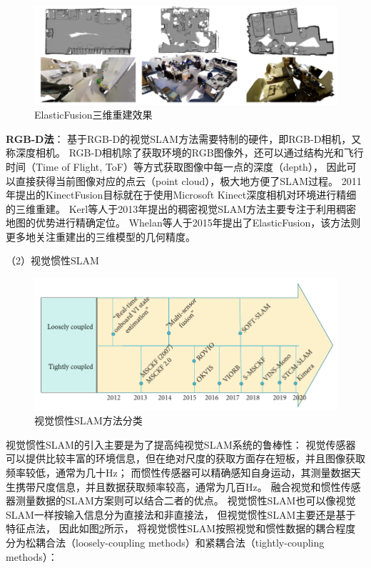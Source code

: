 \begin{figure}[htbp]
    \centering
    \includegraphics[width = \textwidth]{figures/elastic_fusion_demo.png}
    \caption{ElasticFusion三维重建效果\cite{whelan2015elasticfusion}}
    \label{fig:elastic_fusion_demo}
\end{figure}
\textbf{RGB-D法}：
基于RGB-D的视觉SLAM方法需要特制的硬件，即RGB-D相机，又称深度相机。
RGB-D相机除了获取环境的RGB图像外，还可以通过结构光和飞行时间（Time of Flight, ToF）等方式获取图像中每一点的深度（depth），
因此可以直接获得当前图像对应的点云（point cloud），极大地方便了SLAM过程。
2011年提出的KinectFusion\cite{newcombe2011kinectfusion}目标就在于使用Microsoft Kinect深度相机对环境进行精细的三维重建。
Kerl等人于2013年提出的稠密视觉SLAM方法\cite{kerl2013dense}主要专注于利用稠密地图的优势进行精确定位。
Whelan等人于2015年提出了ElasticFusion\cite{whelan2015elasticfusion}，该方法则更多地关注重建出的三维模型的几何精度。

（2）视觉惯性SLAM

\begin{figure}[htbp]
    \centering
    \includegraphics[width = \textwidth]{figures/vislam_classification.png}
    \caption{视觉惯性SLAM方法分类\cite{servieres2021visual}}
    \label{fig:vislam_classification}
\end{figure}

视觉惯性SLAM的引入主要是为了提高纯视觉SLAM系统的鲁棒性：
视觉传感器可以提供比较丰富的环境信息，但在绝对尺度的获取方面存在短板，并且图像获取频率较低，通常为几十Hz；
而惯性传感器可以精确感知自身运动，其测量数据天生携带尺度信息，并且数据获取频率较高，通常为几百Hz。
融合视觉和惯性传感器测量数据的SLAM方案则可以结合二者的优点。
视觉惯性SLAM也可以像视觉SLAM一样按输入信息分为直接法和非直接法，
但视觉惯性SLAM主要还是基于特征点法，
因此如图\ref{fig:vislam_classification}所示，
将视觉惯性SLAM按照视觉和惯性数据的耦合程度分为松耦合法（loosely-coupling methods）和紧耦合法（tightly-coupling methods）\cite{servieres2021visual}：

